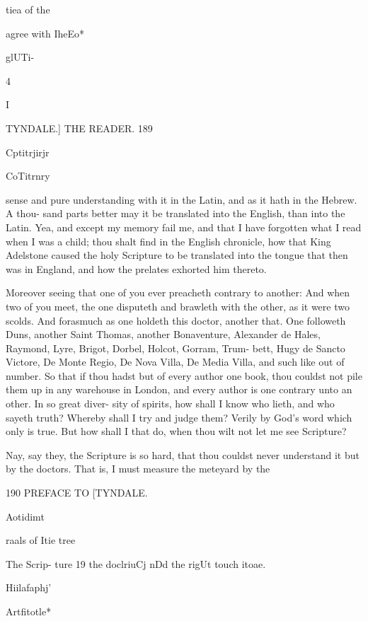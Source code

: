 \documentclass{custom}
\begin{document}
tiea of the 

agree with 
IheEo* 

glUTi- 

4 

I 


TYNDALE.]
THE READER. 
189

Cptitrjirjr 

CoTitrnry 

sense and pure understanding with it in the 
Latin, and as it hath in the Hebrew. A thou- 
sand parts better may it be translated into the 
English, than into the Latin. Yea, and except 
my memory fail me, and that I have forgotten 
what I read when I was a child; thou shalt find in 
the English chronicle, how that King Adelstone
caused the holy Scripture to be translated into
the tongue that then was in England, and how 
the prelates exhorted him thereto. 

Moreover seeing that one of you ever preacheth 
contrary to another: And when two of you 
meet, the one disputeth and brawleth with the 
other, as it were two scolds. And forasmuch 
as one holdeth this doctor, another that. One 
followeth Duns, another Saint Thomas, another
Bonaventure, Alexander de Hales, Raymond, 
Lyre, Brigot, Dorbel, Holcot, Gorram, Trum- 
bett, Hugy de Sancto Victore, De Monte Regio, 
De Nova Villa, De Media Villa, and such like out 
of number. So that if thou hadst but of every 
author one book, thou couldst not pile them up 
in any warehouse in London, and every author 
is one contrary unto an other. In so great diver- 
sity of spirits, how shall I know who lieth, and 
who sayeth truth? Whereby shall I try and 
judge them? Verily by God's word which 
only is true. But how shall I that do, when thou 
wilt not let me see Scripture? 

Nay, say they, the Scripture is so hard, that 
thou couldst never understand it but by the doctors. 
That is, I must measure the meteyard by the 


190 
PREFACE TO 
[TYNDALE.

Aotidimt 

raals of 
Itie tree 

The Scrip- 
ture 19 the 
doclriuCj 
nDd the 
rigUt touch 
itoae. 

Hiilafaphj' 

Artfitotle* 
\end{document}
